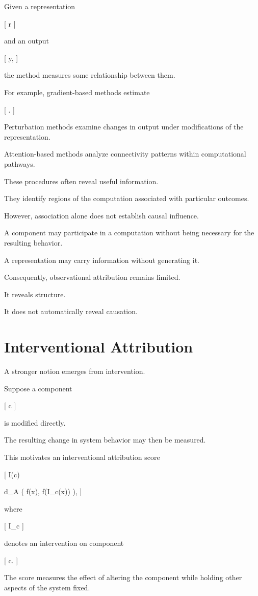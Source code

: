\documentclass[11pt,oneside,openany]{book}
\begin{document}
Given a representation

[
r
]

and an output

[
y,
]

the method measures some relationship between them.

For example, gradient-based methods estimate

[
.
]

Perturbation methods examine changes in output under modifications of the representation.

Attention-based methods analyze connectivity patterns within computational pathways.

These procedures often reveal useful information.

They identify regions of the computation associated with particular outcomes.

However, association alone does not establish causal influence.

A component may participate in a computation without being necessary for the resulting behavior.

A representation may carry information without generating it.

Consequently, observational attribution remains limited.

It reveals structure.

It does not automatically reveal causation.

\section{Interventional Attribution}

A stronger notion emerges from intervention.

Suppose a component

[
c
]

is modified directly.

The resulting change in system behavior may then be measured.

This motivates an interventional attribution score

[
I(c)

d_A
\Big(
f(x),
f(I_c(x))
\Big),
]

where

[
I_c
]

denotes an intervention on component

[
c.
]

The score measures the effect of altering the component while holding other aspects of the system fixed.
\end{document}
